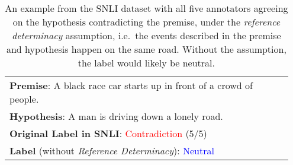 \begin{table}[t]
\centering
    \begin{tabular}{p{0.95\linewidth}}
        \toprule
        \textbf{Premise}: A black race car starts up in front of a crowd of people.	  \\
        \textbf{Hypothesis}: A man is driving down a lonely road.  \\
        \midrule
        \textbf{Original Label in SNLI}: \textcolor{red}{Contradiction} (5/5) \\
        \textbf{Label} {\small (without \textit{Reference Determinacy})}: \textcolor{blue}{Neutral} \\
        \bottomrule
    \end{tabular}
    \caption{An example from the SNLI dataset \cite{bowman-etal-2015-large} with all five annotators agreeing on the hypothesis contradicting the premise, under the \textit{reference determinacy} assumption, i.e.\ the events described in the premise and hypothesis happen on the same road. Without the assumption, the label would likely be neutral.}
    \vspace{-10pt}
    \label{tab:lead}
\end{table}